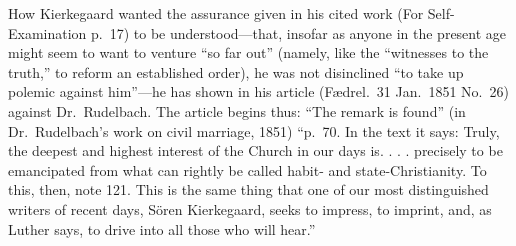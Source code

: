 \documentclass[12pt,a4paper]{article}
\begin{document}
How Kierkegaard wanted the assurance given in his cited
work (For Self-Examination p.\ 17) to be understood---that,
insofar as anyone in the present age might seem to want to venture ``so
far out'' (namely, like the ``witnesses to the
truth,'' to reform an established order), he was not
disinclined ``to take up polemic against him''---he has
shown in his article (Fædrel.\ 31 Jan.\ 1851 No.\ 26) against
Dr.\ Rudelbach. The article begins thus: ``The remark is
found'' (in Dr.\ Rudelbach's work on civil marriage,
1851) ``p.\ 70. In the text it says: Truly, the deepest
and highest interest of the Church in our days is. . . . precisely to be
emancipated from what can rightly be called habit- and
state-Christianity. To this, then, note 121. This is the
same thing that one of our most distinguished writers of
recent days, Sören Kierkegaard, seeks to impress,
to imprint, and, as Luther says, to drive into all those who
will hear.''
\end{document}

